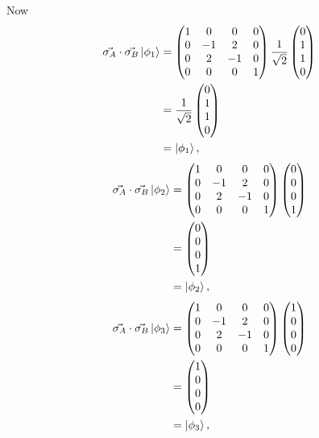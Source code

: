 \documentclass[10pt]{article}
\begin{document}
Now
\begin{align*}
\vec{\sigma_A} \cdot \vec{\sigma_B} \ket{\phi_1} &= 
\begin{pmatrix}
1 & 0 & 0 & 0 \\
0 & -1 & 2 & 0 \\
0 & 2 & -1 & 0 \\
0 & 0 & 0 & 1
\end{pmatrix} 
\frac{1}{\sqrt{2}}
\begin{pmatrix}
0 \\
1 \\
1 \\
0
\end{pmatrix} \\
   &= 
   \frac{1}{\sqrt{2}}
\begin{pmatrix}
0 \\
1 \\
1 \\
0
\end{pmatrix} \\
&= \ket{\phi_1},
\end{align*}
\begin{align*}
\vec{\sigma_A} \cdot \vec{\sigma_B} \ket{\phi_2} &=
\begin{pmatrix}
1 & 0 & 0 & 0 \\
0 & -1 & 2 & 0 \\
0 & 2 & -1 & 0 \\
0 & 0 & 0 & 1
\end{pmatrix} 
\begin{pmatrix}
0 \\
0 \\
0 \\
1
\end{pmatrix} \\
&= 
\begin{pmatrix}
0 \\
0 \\
0 \\
1 
\end{pmatrix} \\
&= \ket{\phi_2},
\end{align*}
\begin{align*}
\vec{\sigma_A} \cdot \vec{\sigma_B} \ket{\phi_3} &= 
\begin{pmatrix}
1 & 0 & 0 & 0 \\
0 & -1 & 2 & 0 \\
0 & 2 & -1 & 0 \\
0 & 0 & 0 & 1
\end{pmatrix} 
\begin{pmatrix}
1 \\
0 \\
0 \\
0
\end{pmatrix} \\
&= 
\begin{pmatrix}
1 \\
0 \\
0 \\
0
\end{pmatrix} \\
&= \ket{\phi_3},
\end{align*}
\end{document}
